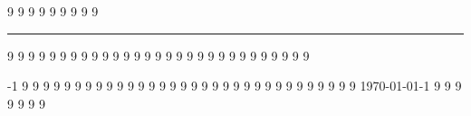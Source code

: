  9
 9
 9
 9
 9
 9
 9
 9
 9
\rule                        -1 9
 9
 9
 9
 9
 9
 9
 9
 9
 9
 9
 9
 9
 9
 9
 9
 9
 9
 9
 9
 9
 9
 9
 9
 9
 9
 9
 9
 9
\strut                       -1 9
 9
 9
 9
 9
 9
 9
 9
 9
 9
 9
 9
 9
 9
 9
 9
 9
 9
 9
 9
 9
 9
 9
 9
 9
 9
 9
 9
 9
 9
 9
 9
\today                       -1 9
 9
 9
 9
 9
 9
 9
